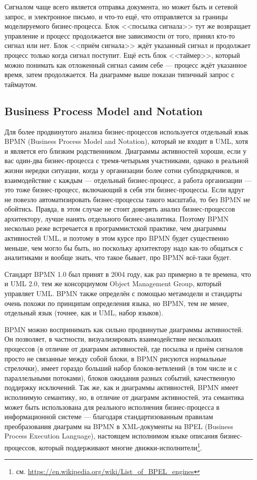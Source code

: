 \documentclass{../../text-style}
\begin{document}
Сигналом чаще всего является отправка документа, но может быть и сетевой запрос, и электронное письмо, и что-то ещё, что отправляется за границы моделируемого бизнес-процесса. Блок <<посылка сигнала>> тут же возвращает управление и процесс продолжается вне зависимости от того, принял кто-то сигнал или нет. Блок <<приём сигнала>> ждёт указанный сигнал и продолжает процесс только когда сигнал поступит. Ещё есть блок <<таймер>>, который можно понимать как отложенный сигнал самим себе --- процесс ждёт указанное время, затем продолжается. На диаграмме выше показан типичный запрос с таймаутом.

\subsection{Business Process Model and Notation}

Для более продвинутого анализа бизнес-процессов используется отдельный язык BPMN (Business Process Model and Notation), который не входит в UML, хотя и является его близким родственником. Диаграммы активностей хороши, если у вас один-два бизнес-процесса с тремя-четырьмя участниками, однако в реальной жизни нередки ситуации, когда у организации более сотни субподрядчиков, и взаимодействие с каждым --- отдельный бизнес-процесс, а работа организации --- это тоже бизнес-процесс, включающий в себя эти бизнес-процессы. Если вдруг не повезло автоматизировать бизнес-процессы такого масштаба, то без BPMN не обойтись. Правда, в этом случае не стоит доверять анализ бизнес-процессов архитектору, лучше нанять отдельного бизнес-аналитика. Поэтому BPMN несколько реже встречается в программистской практике, чем диаграммы активностей UML, и поэтому в этом курсе про BPMN будет существенно меньше, чем могло бы быть, но поскольку архитектору надо как-то общаться с аналитиками и вообще знать, что такое бывает, про BPMN всё-таки будет.

Стандарт BPMN 1.0 был принят в 2004 году, как раз примерно в те времена, что и UML 2.0, тем же консорциумом Object Management Group, который управляет UML. BPMN также определён с помощью метамодели и стандарты очень похожи по принципам определения языка, но BPMN, тем не менее, отдельный язык (точнее, как и UML, набор языков).

BPMN можно воспринимать как сильно продвинутые диаграммы активностей. Он позволяет, в частности, визуализировать взаимодействие нескольких процессов (в отличие от диаграмм активностей, где посылка и приём сигналов просто не связанные между собой блоки, в BPMN рисуются нормальные стрелочки), имеет гораздо больший набор блоков-ветвлений (в том числе и с параллельными потоками), блоков ожидания разных событий, качественную поддержку исключений. Так же, как и диаграммы активностей, BPMN имеет исполнимую семантику, но, в отличие от диаграмм активностей, эта семантика может быть использована для реального исполнения бизнес-процесса в информационной системе --- благодаря стандартизованным правилам преобразования диаграмм на BPMN в XML-документы на BPEL (Business Process Execution Language), настоящем исполнимом языке описания бизнес-процессов, который поддерживают многие движки-исполнители\footnote{см. \url{https://en.wikipedia.org/wiki/List_of_BPEL_engines}}.
\end{document}
